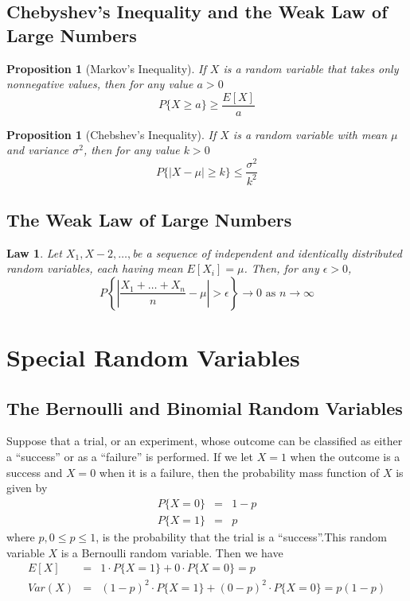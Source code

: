 \documentclass[12pt]{article}
\newtheorem{law}[theorem]{Law}
\newtheorem{proposition}[theorem]{Proposition}
\begin{document}
\subsection{Chebyshev's Inequality and the Weak Law of Large Numbers}

\begin{proposition} [Markov's Inequality]
  If $X$ is a random variable that takes only nonnegative values, then for any value $a>0$
  \begin{equation*}
    P\{ X \ge a \} \ge \frac {E[X]}{a}
  \end{equation*}
\end{proposition}

\begin{proposition} [Chebshev's Inequality]
  If $X$ is a random variable with mean $\mu$ and variance $\sigma^2$, then for any value $k>0$
  \begin{equation*}
    P\{ |X-\mu| \ge k \} \le \frac {\sigma^2}{k^2}
  \end{equation*}
\end{proposition}

\subsection{The Weak Law of Large Numbers}

\begin{law}
  Let $X_1, X-2,\dots,$be a sequence of independent and identically distributed random variables, each having mean $E[X_i] = \mu$. Then, for any $\epsilon > 0$,
  \begin{equation*}
    P \left\{ \left|\frac{X_1 + \dots + X_n}{n} - \mu \right| 
        > \epsilon \right\} \rightarrow 0 \text{  as } n \rightarrow \infty
  \end{equation*}
\end{law}

\section{Special Random Variables}

\subsection{The Bernoulli and Binomial Random Variables}

Suppose that a trial, or an experiment, whose outcome can be classified as either a ``success'' or as a ``failure'' is performed. If we let $X=1$ when the outcome is a success and $X=0$ when it is a failure, then the probability mass function of $X$ is given by
\begin{eqnarray*}
  P\{X=0\} &=& 1-p \\
  P\{X=1\} &=& p
\end{eqnarray*}
where $p, 0 \le p \le 1$, is the probability that the trial is a ``success''.This random variable $X$ is a Bernoulli random variable. Then we have
\begin{eqnarray*}
  E[X] &=& 1 \cdot P\{X=1\} + 0 \cdot P\{X=0\} = p \\
  Var(X) &=& (1-p)^2 \cdot P\{X=1\} + (0-p)^2 \cdot P\{X=0\} = p(1-p)
\end{eqnarray*}
\end{document}
